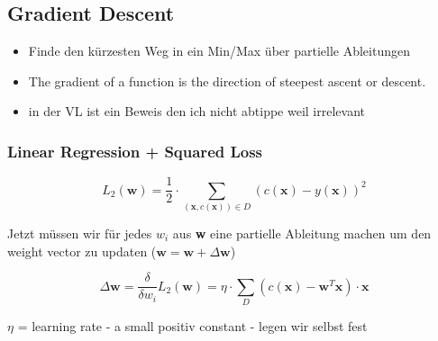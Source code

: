 \documentclass[11pt,a4paper]{article}
\begin{document}
\begin{flushleft}
\subsection{Gradient Descent}
\begin{itemize}
\item Finde den kürzesten Weg in ein Min/Max über partielle Ableitungen
\item The gradient of a function is the direction of steepest ascent or descent.
\item in der VL ist ein Beweis den ich nicht abtippe weil irrelevant 
\end{itemize}
\subsubsection{Linear Regression + Squared Loss}

$$ L_2(\textbf{w}) = \dfrac{1}{2} \cdot \displaystyle\sum_{(\textbf{x}, c(\textbf{x})) \in D} (c(\textbf{x}) - y(\textbf{x}))^2$$

Jetzt müssen wir für jedes $w_i$ aus \textbf{w} eine partielle Ableitung machen um den weight vector zu updaten ($ \textbf{w} = \textbf{w} + \Delta \textbf{w}$)

$$ \Delta\textbf{w} =  \dfrac{ \delta }{\delta w_i} L_2 (\textbf{w}) = \eta \cdot \displaystyle\sum_D (c(\textbf{x}) - \textbf{w}^T\textbf{x}) \cdot \textbf{x}$$

$\eta$ = learning rate - a small positiv constant - legen wir selbst fest


\end{flushleft}
\end{document}
